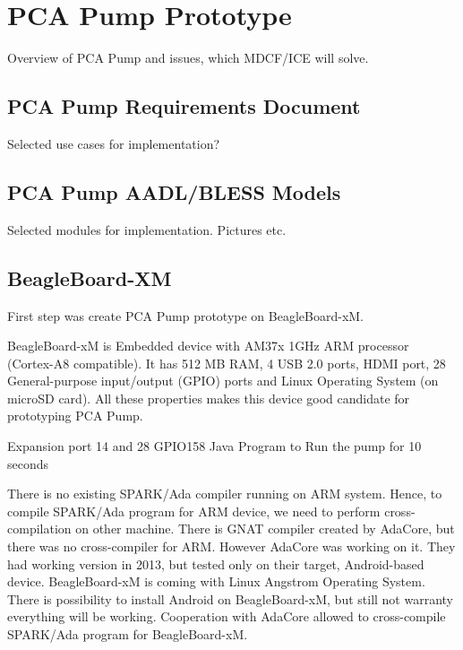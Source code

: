 
\cleardoublepage


\chapter{PCA Pump Prototype}
\label{pcapump}

Overview of PCA Pump and issues, which MDCF/ICE will solve.


\section{PCA Pump Requirements Document}
\label{pcapump:requirements-doc}
Selected use cases for implementation?


\section{PCA Pump AADL/BLESS Models}
\label{pcapump:aadl-bless-models}
Selected modules for implementation. Pictures etc.


\section{BeagleBoard-XM}
\label{pcapump:beagleboard}
First step was create PCA Pump prototype on BeagleBoard-xM.

BeagleBoard-xM is Embedded device with AM37x 1GHz ARM processor (Cortex-A8 compatible). It has 512 MB RAM, 4 USB 2.0 ports, HDMI port, 28 General-purpose input/output (GPIO) ports and Linux Operating System (on microSD card). All these properties makes this device good candidate for prototyping PCA Pump.

Expansion port 14 and 28
GPIO158
Java Program to Run the pump for 10 seconds

There is no existing SPARK/Ada compiler running on ARM system. Hence, to compile SPARK/Ada program for ARM device, we need to perform cross-compilation on other machine. There is GNAT compiler \cite{Horn:Thesis} created by AdaCore, but there was no cross-compiler for ARM. However AdaCore was working on it. They had working version in 2013, but tested only on their target, Android-based device. BeagleBoard-xM is coming with Linux Angstrom Operating System. There is possibility to install Android on BeagleBoard-xM, but still not warranty everything will be working. Cooperation with AdaCore allowed to cross-compile SPARK/Ada program for BeagleBoard-xM.

